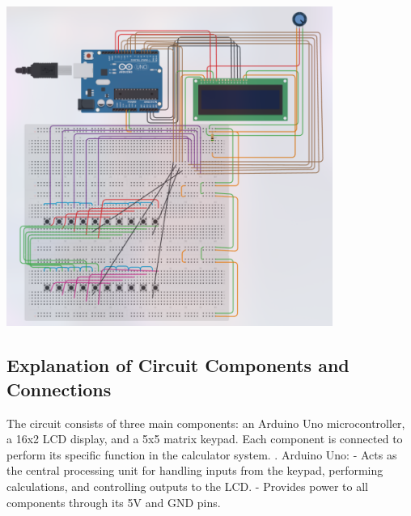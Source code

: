 \documentclass[12pt]{article}
\begin{document}
\begin{center}
    \includegraphics[width=0.8\textwidth]{figs/circuit.jpg}
\end{center}

\subsection*{Explanation of Circuit Components and Connections}

The circuit consists of three main components: an Arduino Uno microcontroller, a 16x2 LCD display, and a 5x5 matrix keypad. Each component is connected to perform its specific function in the calculator system.
. Arduino Uno:\newline
   - Acts as the central processing unit for handling inputs from the keypad, performing calculations, and controlling outputs to the LCD.\newline
   - Provides power to all components through its 5V and GND pins.\newline
\end{document}
